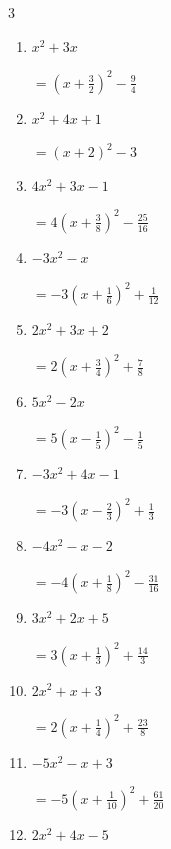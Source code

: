 \begin{multicols}{3}
\begin{enumerate}
  \item $x^{2}+3x$

        $\displaystyle =\left( x+\frac{3}{2}\right)^{2}-\frac{9}{4}$

  \item $x^{2}+4x+1$

        $\displaystyle =\left( x+2\right)^{2}-3$

  \item $4x^{2}+3x-1$

        $\displaystyle =4\left( x+\frac{3}{8}\right)^{2}-\frac{25}{16}$

  \item $-3x^{2}-x$

        $\displaystyle =-3\left( x+\frac{1}{6}\right)^{2}+\frac{1}{12}$

\columnbreak %

\resetques

  \item $2x^{2}+3x+2$

        $\displaystyle =2\left( x+\frac{3}{4}\right)^{2}+\frac{7}{8}$

  \item $5x^{2}-2x$

        $\displaystyle =5\left( x-\frac{1}{5}\right)^{2}-\frac{1}{5}$

  \item $-3x^{2}+4x-1$

        $\displaystyle =-3\left( x-\frac{2}{3}\right)^{2}+\frac{1}{3}$

  \item $-4x^{2}-x-2$

        $\displaystyle =-4\left( x+\frac{1}{8}\right)^{2}-\frac{31}{16}$

  \item $3x^{2}+2x+5$

        $\displaystyle =3\left( x+\frac{1}{3}\right)^{2}+\frac{14}{3}$

\columnbreak %

  \item $2x^{2}+x+3$

        $\displaystyle =2\left( x+\frac{1}{4}\right)^{2}+\frac{23}{8}$

  \item $-5x^{2}-x+3$

        $\displaystyle =-5\left( x+\frac{1}{10}\right)^{2}+\frac{61}{20}$

  \item $2x^{2}+4x-5$


\end{enumerate}
\end{multicols}
